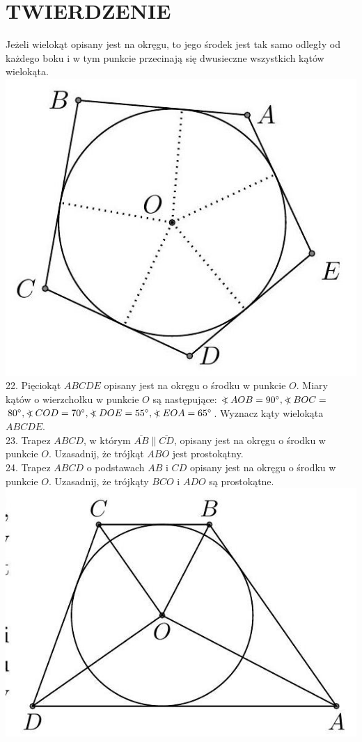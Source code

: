 \documentclass[10pt]{article}
\newcommand\Varangle{\mathop{{<\!\!\!\!\!\text{\small)}}\:}\nolimits}
\begin{document}
\section*{TWIERDZENIE}
Jeżeli wielokąt opisany jest na okręgu, to jego środek jest tak samo odległy od każdego boku i w tym punkcie przecinają się dwusieczne wszystkich kątów wielokąta.\\
\includegraphics[max width=\textwidth, center]{2024_11_21_e9b4faa005d5be2cc318g-052}\\
22. Pięciokąt \(A B C D E\) opisany jest na okręgu o środku w punkcie \(O\). Miary kątów o wierzchołku w punkcie \(O\) są następujące: \(\Varangle A O B=90^{\circ}, \Varangle B O C=\) \(80^{\circ}, \Varangle C O D=70^{\circ}, \Varangle D O E=55^{\circ}, \Varangle E O A=65^{\circ}\). Wyznacz kąty wielokąta \(A B C D E\).\\
23. Trapez \(A B C D\), w którym \(\overline{A B} \| \overline{C D}\), opisany jest na okręgu o środku w punkcie \(O\). Uzasadnij, że trójkąt \(A B O\) jest prostokątny.\\
24. Trapez \(A B C D\) o podstawach \(A B\) i \(C D\) opisany jest na okręgu o środku w punkcie \(O\). Uzasadnij, że trójkąty \(B C O\) i \(A D O\) są prostokątne.\\
\includegraphics[max width=\textwidth, center]{2024_11_21_e9b4faa005d5be2cc318g-053}\\
\end{document}
